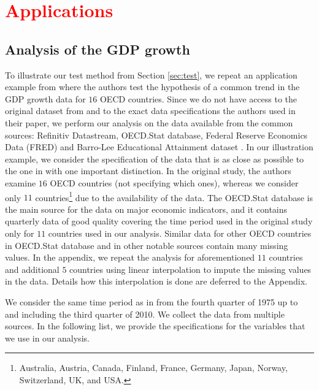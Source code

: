 \documentclass[a4paper,12pt]{article}
\begin{document}
\section{\textcolor{red}{Applications}}\label{sec:app}
\subsection{Analysis of the GDP growth}\label{subsec:app:gdp}


To illustrate our test method from Section \ref{sec:test}, we repeat an application example from \cite{Zhang2012} where the authors test the hypothesis of a common trend in the GDP growth data for $16$ OECD countries. Since we do not have access to the original dataset from \cite{Zhang2012} and to the exact data specifications the authors used in their paper, we perform our analysis on the data available from the common sources: Refinitiv Datastream, OECD.Stat database, Federal Reserve Economics Data (FRED) and Barro-Lee Educational Attainment dataset \citep*{Barro2013}. In our illustration example, we consider the specification of the data that is as close as possible to the one in \linebreak \cite{Zhang2012} with one important distinction. In the original study, the authors examine $16$ OECD countries (not specifying which ones), whereas we consider only $11$ countries\footnote{Australia, Austria, Canada, Finland, France, Germany, Japan, Norway, Switzerland, UK, and USA.} due to the availability of the data. The OECD.Stat database is the main source for the data on major economic indicators, and it contains  quarterly data of good quality covering the time period used in the original study only for $11$ countries used in our analysis. Similar data for other OECD countries in OECD.Stat database and in other notable sources contain many missing values. In the appendix, we repeat the analysis for aforementioned $11$ countries and additional $5$ countries using linear interpolation to impute the missing values in the data. Details how this interpolation is done are deferred to the Appendix.

We consider the same time period as in \cite{Zhang2012} from the fourth quarter of 1975 up to and including the third quarter of 2010. We collect the data from multiple sources. In the following list, we provide the specifications for the variables that we use in our analysis.
\end{document}

